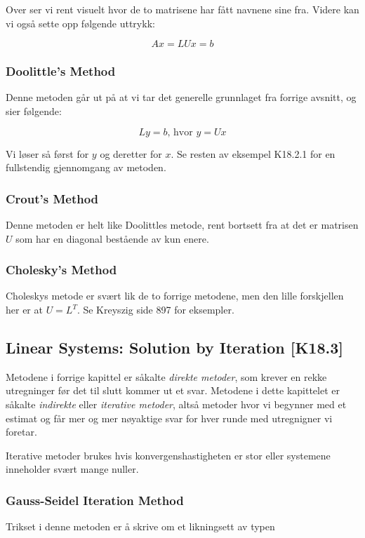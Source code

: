 \documentclass[norsk, a4paper, 12pt, titlepage]{article}
\begin{document}
Over ser vi rent visuelt hvor de to matrisene har fått navnene sine
fra. Videre kan vi også sette opp følgende uttrykk:

\begin{equation}
Ax = LUx = b
\end{equation}



\subsubsection{Doolittle's Method}
Denne metoden går ut på at vi tar det generelle grunnlaget fra forrige
avsnitt, og sier følgende:

\begin{equation}
Ly = b\text{, hvor } y = Ux
\end{equation}

Vi løser så først for $y$ og deretter for $x$.  Se resten av eksempel
K18.2.1 for en fullstendig gjennomgang av metoden.

\subsubsection{Crout's Method}
Denne metoden er helt like Doolittles metode, rent bortsett fra at det
er matrisen $U$ som har en diagonal bestående av kun enere.

\subsubsection{Cholesky's Method}
Choleskys metode er svært lik de to forrige metodene, men den lille
forskjellen her er at $U = L^{T}$.  Se Kreyszig side 897 for eksempler.

\subsection{Linear Systems: Solution by Iteration [K18.3]}
Metodene i forrige kapittel er såkalte \textit{direkte metoder}, som
krever en rekke utregninger før det til slutt kommer ut et svar.
Metodene i dette kapittelet er såkalte \textit{indirekte} eller
\textit{iterative metoder}, altså metoder hvor vi begynner med et
estimat og får mer og mer nøyaktige svar for hver runde med
utregnigner vi foretar.

Iterative metoder brukes hvis konvergenshastigheten er stor eller
systemene inneholder svært mange nuller.

\subsubsection{Gauss-Seidel Iteration Method}
Trikset i denne metoden er å skrive om et likningsett av typen
\end{document}
